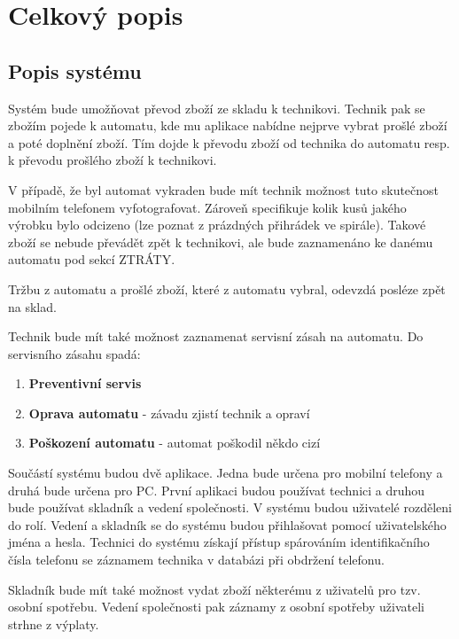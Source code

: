 \documentclass[a4paper,10pt]{article}
\begin{document}
\section{Celkový popis}
\subsection{Popis systému}
Systém bude umožňovat převod zboží ze skladu k technikovi. Technik pak se zbožím pojede k automatu, kde mu aplikace nabídne nejprve vybrat prošlé zboží a poté doplnění zboží. Tím dojde k převodu zboží od technika do automatu resp. k převodu prošlého zboží k technikovi.

V případě, že byl automat vykraden bude mít technik možnost tuto skutečnost mobilním telefonem vyfotografovat. Zároveň specifikuje kolik kusů jakého výrobku bylo odcizeno (lze poznat z prázdných přihrádek ve spirále). Takové zboží se nebude převádět zpět k technikovi, ale bude zaznamenáno ke danému automatu pod sekcí ZTRÁTY.

Tržbu z automatu a prošlé zboží, které z automatu vybral, odevzdá posléze zpět na sklad.

Technik bude mít také možnost zaznamenat servisní zásah na automatu. Do servisního zásahu spadá:
\begin{enumerate}
	\item \textbf{Preventivní servis}
	\item \textbf{Oprava automatu} - závadu zjistí technik a opraví
	\item \textbf{Poškození automatu} - automat poškodil někdo cizí
\end{enumerate}

Součástí systému budou dvě aplikace. Jedna bude určena pro mobilní telefony a druhá bude určena pro PC. První aplikaci budou používat technici a druhou bude používat skladník a vedení společnosti. V systému budou uživatelé rozděleni do rolí. Vedení a skladník se do systému budou přihlašovat pomocí uživatelského jména a hesla. Technici do systému získají přístup spárováním identifikačního čísla telefonu se záznamem technika v databázi při obdržení telefonu.

Skladník bude mít také možnost vydat zboží některému z uživatelů pro tzv. osobní spotřebu. Vedení společnosti pak záznamy z osobní spotřeby uživateli strhne z výplaty.
\end{document}
